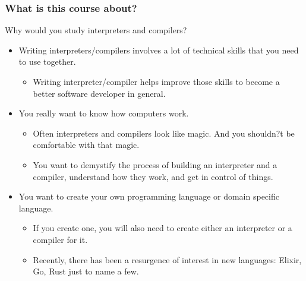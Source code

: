 \documentclass{beamer}
\begin{document}
\begin{frame}[fragile]
\frametitle{What is this course about?}

Why would you study interpreters and compilers? 
\pause
\begin{itemize}
\item Writing interpreters/compilers involves a lot of technical skills that you need to use together. 
\begin{itemize}
\item Writing interpreter/compiler helps improve those skills to become a better software developer in general. 
\end{itemize}
\pause

\item You really want to know how computers work. 
\begin{itemize}

\item Often interpreters and compilers look like magic. And you shouldn?t be comfortable with that magic. 

\item You want to demystify the process of building an interpreter and a compiler, understand how they work, and get in control of things.
\end{itemize}
\pause

\item You want to create your own programming language or domain specific language. 
\begin{itemize}
\item If you create one, you will also need to create either an interpreter or a compiler for it. 
\item Recently, there has been a resurgence of interest in new  languages: Elixir, Go, Rust just to name a few.
\end{itemize}
\end{itemize}

\end{frame}
\end{document}

